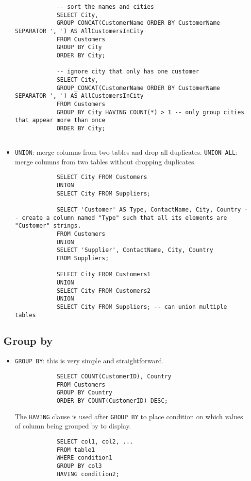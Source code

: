 \documentclass{article}
\begin{document}
\begin{itemize}
\begin{lstlisting}
			-- sort the names and cities
			SELECT City, 
			GROUP_CONCAT(CustomerName ORDER BY CustomerName SEPARATOR ', ') AS AllCustomersInCity
			FROM Customers
			GROUP BY City
			ORDER BY City;
			
			-- ignore city that only has one customer
			SELECT City, 
			GROUP_CONCAT(CustomerName ORDER BY CustomerName SEPARATOR ', ') AS AllCustomersInCity
			FROM Customers
			GROUP BY City HAVING COUNT(*) > 1 -- only group cities that appear more than once
			ORDER BY City;
			
		\end{lstlisting}
		
		\item \texttt{\color{red}UNION}: merge columns from two tables and drop all duplicates. \texttt{\color{red}UNION ALL}: merge columns from two tables without dropping duplicates.
		
		\begin{lstlisting}
			SELECT City FROM Customers
			UNION
			SELECT City FROM Suppliers;
			
			SELECT 'Customer' AS Type, ContactName, City, Country -- create a column named "Type" such that all its elements are "Customer" strings.
			FROM Customers
			UNION
			SELECT 'Supplier', ContactName, City, Country
			FROM Suppliers;
			
			SELECT City FROM Customers1
			UNION
			SELECT City FROM Customers2
			UNION
			SELECT City FROM Suppliers; -- can union multiple tables
		\end{lstlisting}
	\end{itemize}
	
	\subsection{Group by}
	\begin{itemize}
		\item \texttt{\color{red}GROUP BY}: this is very simple and straightforward.
		
		\begin{lstlisting}
			SELECT COUNT(CustomerID), Country
			FROM Customers
			GROUP BY Country
			ORDER BY COUNT(CustomerID) DESC;
		\end{lstlisting}
		
		The \texttt{\color{red}HAVING} clause is used after \texttt{\color{red}GROUP BY} to place condition on which values of column being grouped by to display.
		
		\begin{lstlisting}
			SELECT col1, col2, ...
			FROM table1
			WHERE condition1
			GROUP BY col3
			HAVING condition2;
		\end{lstlisting}
		
	\end{itemize}
	
\end{document}
